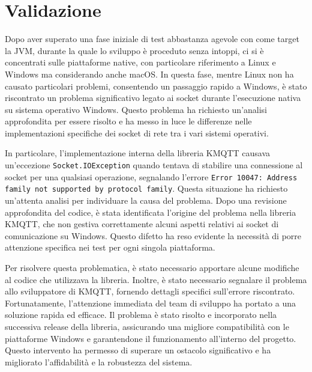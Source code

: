 \documentclass[12pt,a4paper,openright,twoside]{book}
\begin{document}
\section{Validazione}
Dopo aver superato una fase iniziale di test abbastanza agevole con come target la \ac{JVM}, durante la quale lo sviluppo è proceduto senza intoppi, 
ci si è concentrati sulle piattaforme native, con particolare riferimento a Linux e Windows ma considerando anche macOS. 
In questa fase, mentre Linux non ha causato particolari problemi, consentendo un passaggio rapido a Windows, è stato riscontrato un problema significativo legato 
ai socket durante l'esecuzione nativa su sistema operativo Windows. Questo problema ha richiesto un'analisi approfondita per essere risolto e ha messo in luce 
le differenze nelle implementazioni specifiche dei socket di rete tra i vari sistemi operativi.

In particolare, l'implementazione interna della libreria KMQTT causava un'eccezione \texttt{Socket.IOException} quando tentava di stabilire una connessione al 
socket per una qualsiasi operazione, segnalando l'errore \texttt{Error 10047: Address family not supported by protocol family}. 
Questa situazione ha richiesto un'attenta analisi per individuare la causa del problema. Dopo una revisione approfondita del codice, è stata identificata 
l'origine del problema nella libreria KMQTT, che non gestiva correttamente alcuni aspetti relativi ai socket di comunicazione su Windows. 
Questo difetto ha reso evidente la necessità di porre attenzione specifica nei test per ogni singola piattaforma.

Per risolvere questa problematica, è stato necessario apportare alcune modifiche al codice che utilizzava la libreria. Inoltre, è stato necessario segnalare 
il problema allo sviluppatore di KMQTT, fornendo dettagli specifici sull'errore riscontrato. Fortunatamente, l'attenzione immediata del team di sviluppo 
ha portato a una soluzione rapida ed efficace. Il problema è stato risolto e incorporato nella successiva release della libreria, assicurando una migliore 
compatibilità con le piattaforme Windows e garantendone il funzionamento all'interno del progetto. Questo intervento ha permesso di superare un ostacolo 
significativo e ha migliorato l'affidabilità e la robustezza del sistema.
\end{document}
